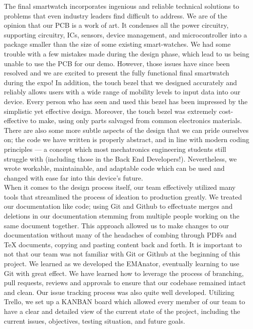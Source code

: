 \documentclass{article}
\begin{document}
The final smartwatch incorporates ingenious and reliable technical solutions to problems that even industry leaders find difficult to address. We are of the opinion that our PCB is a work of art. It condenses all the power circuitry, supporting circuitry, ICs, sensors, device management, and microcontroller into a package smaller than the size of some existing smart-watches. We had some trouble with a few mistakes made during the design phase, which lead to us being unable to use the PCB for our demo. However, those issues have since been resolved and we are excited to present the fully functional final smartwatch during the expo! In addition, the touch bezel that we designed accurately and reliably allows users with a wide range of mobility levels to input data into our device. Every person who has seen and used this bezel has been impressed by the simplistic yet effective design. Moreover, the touch bezel was extremely cost-effective to make, using only parts salvaged from common electronics materials. There are also some more subtle aspects of the design that we can pride ourselves on; the code we have written is properly abstract, and in line with modern coding principles — a concept which most mechatronics engineering students still struggle with (including those in the Back End Developers!). Nevertheless, we wrote workable, maintainable, and adaptable code which can be used and changed with ease far into this device's future.\\

When it comes to the design process itself, our team effectively utilized many tools that streamlined the process of ideation to production greatly. We treated our documentation like code; using Git and Github to effectuate merges and deletions in our documentation stemming from multiple people working on the same document together. This approach allowed us to make changes to our documentation without many of the headaches of combing through PDFs and TeX documents, copying and pasting content back and forth. It is important to not that our team was not familiar with Git or Github at the beginning of this project. We learned as we developed the EMAnator, eventually learning to use Git with great effect. We have learned how to leverage the process of branching, pull requests, reviews and approvals to ensure that our codebase remained intact and clean. Our issue tracking process was also quite well developed. Utilizing Trello, we set up a KANBAN board which allowed every member of our team to have a clear and detailed view of the current state of the project, including the current issues, objectives, testing situation, and future goals.\\
\end{document}
